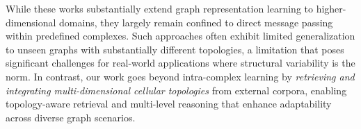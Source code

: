 While these works substantially extend graph representation learning to higher-dimensional domains, they largely remain confined to direct message passing within predefined complexes. Such approaches often exhibit limited generalization to unseen graphs with substantially different topologies, a limitation that poses significant challenges for real-world applications where structural variability is the norm. In contrast, our work goes beyond intra-complex learning by \textit{retrieving and integrating multi-dimensional cellular topologies} from external corpora, enabling topology-aware retrieval and multi-level reasoning that enhance adaptability across diverse graph scenarios.







